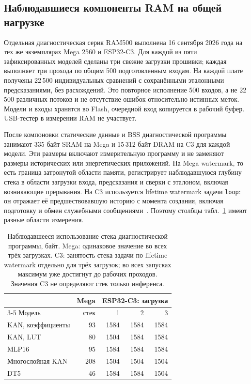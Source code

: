 \subsection{Наблюдавшиеся компоненты RAM на общей нагрузке}
\label{sec:ram500}
Отдельная диагностическая серия RAM500 выполнена 16 сентября 2026 года на тех же экземплярах Mega 2560 и ESP32-C3. Для каждой из пяти зафиксированных моделей сделаны три свежие загрузки прошивки; каждая выполняет три прохода по общим 500 подготовленным входам. На каждой плате получены 22\,500 индивидуальных сравнений с сохранёнными эталонными предсказаниями, без расхождений. Это повторное исполнение 500 входов, а не 22\,500 различных потоков и не отсутствие ошибок относительно истинных меток. Модели и входы хранятся во Flash, очередной вход копируется в рабочий буфер. USB-тестер в измерении RAM не участвует.

После компоновки статические данные и BSS диагностической программы занимают 335 байт SRAM на Mega и 15\,312 байт DRAM на C3 для каждой модели. Эти размеры включают измерительную программу и не заменяют размеры исторических или энергетических приложений. На Mega watermark, то есть граница затронутой области памяти, регистрирует наблюдавшуюся глубину стека в области загрузки входа, предсказания и сверки с эталоном, включая возникающие прерывания. На C3 используется lifetime watermark задачи \texttt{loop}: он отражает её предшествовавшую историю с момента создания, включая подготовку и обмен служебными сообщениями~\cite{EspressifFreeRTOS447}. Поэтому столбцы табл.~\ref{tab:ram500} имеют разные области измерения.

\begin{table}[!htbp]
\centering\small\setlength{\tabcolsep}{8pt}
\caption{Наблюдавшееся использование стека диагностической программы, байт. Mega: одинаковое значение во всех трёх загрузках. C3: занятость стека задачи по lifetime watermark отдельно для трёх загрузок; во всех запусках максимум уже достигнут до рабочих проходов. Значения C3 не определяют стек только инференса.}
\label{tab:ram500}
\begin{tabular}{lrrrr}
\toprule
& Mega & \multicolumn{3}{c}{ESP32-C3: загрузка}\\
\cmidrule(lr){3-5}
Модель & стек & 1 & 2 & 3\\
\midrule
KAN, коэффициенты & 93 & 1584 & 1584 & 1584\\
KAN, LUT & 80 & 1504 & 1584 & 1584\\
MLP16 & 95 & 1584 & 1584 & 1584\\
Многослойная KAN & 208 & 1504 & 1504 & 1504\\
DT5 & 46 & 1584 & 1584 & 1504\\
\bottomrule
\end{tabular}
\end{table}

